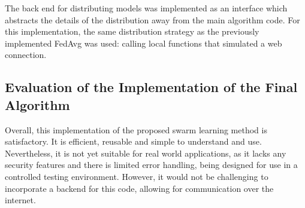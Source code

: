 The back end for distributing models was implemented as an interface which abstracts the details of the distribution away from the main algorithm code. For this implementation, the same distribution strategy as the previously implemented FedAvg was used: calling local functions that simulated a web connection.

\subsection{Evaluation of the Implementation of the Final Algorithm}
Overall, this implementation of the proposed swarm learning method is satisfactory. It is efficient, reusable and simple to understand and use. Nevertheless, it is not yet suitable for real world applications, as it lacks any security features and there is limited error handling, being designed for use in a controlled testing environment. However, it would not be challenging to incorporate a backend for this code, allowing for communication over the internet.